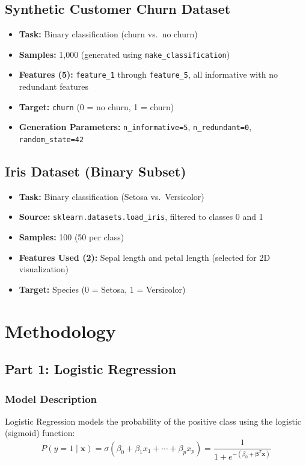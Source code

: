 \documentclass[12pt,a4paper]{article}
\begin{document}
\subsection{Synthetic Customer Churn Dataset}
\begin{itemize}
    \item \textbf{Task:} Binary classification (churn vs.\ no churn)
    \item \textbf{Samples:} 1,000 (generated using \texttt{make\_classification})
    \item \textbf{Features (5):} \texttt{feature\_1} through \texttt{feature\_5}, all informative with no redundant features
    \item \textbf{Target:} \texttt{churn} (0 = no churn, 1 = churn)
    \item \textbf{Generation Parameters:} \texttt{n\_informative=5}, \texttt{n\_redundant=0}, \texttt{random\_state=42}
\end{itemize}

\subsection{Iris Dataset (Binary Subset)}
\begin{itemize}
    \item \textbf{Task:} Binary classification (Setosa vs.\ Versicolor)
    \item \textbf{Source:} \texttt{sklearn.datasets.load\_iris}, filtered to classes 0 and 1
    \item \textbf{Samples:} 100 (50 per class)
    \item \textbf{Features Used (2):} Sepal length and petal length (selected for 2D visualization)
    \item \textbf{Target:} Species (0 = Setosa, 1 = Versicolor)
\end{itemize}

\section{Methodology}

\subsection{Part 1: Logistic Regression}

\subsubsection{Model Description}
Logistic Regression models the probability of the positive class using the logistic (sigmoid) function:
\begin{equation}
    P(y=1 \mid \mathbf{x}) = \sigma(\beta_0 + \beta_1 x_1 + \cdots + \beta_p x_p) = \frac{1}{1 + e^{-(\beta_0 + \boldsymbol{\beta}^T \mathbf{x})}}
\end{equation}
\end{document}
